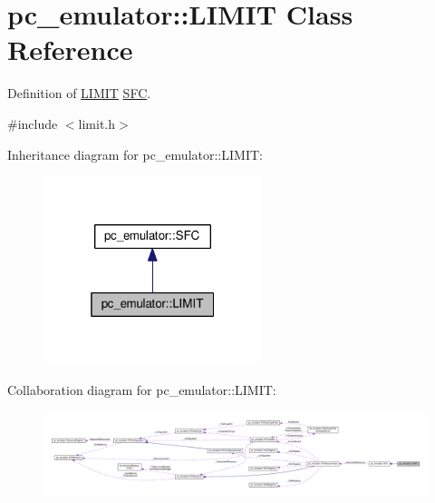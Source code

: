 \hypertarget{classpc__emulator_1_1LIMIT}{}\section{pc\+\_\+emulator\+:\+:L\+I\+M\+IT Class Reference}
\label{classpc__emulator_1_1LIMIT}


Definition of \hyperlink{classpc__emulator_1_1LIMIT}{L\+I\+M\+IT} \hyperlink{classpc__emulator_1_1SFC}{S\+FC}.  




{\ttfamily \#include $<$limit.\+h$>$}



Inheritance diagram for pc\+\_\+emulator\+:\+:L\+I\+M\+IT\+:\nopagebreak
\begin{figure}[H]
\begin{center}
\leavevmode
\includegraphics[width=181pt]{classpc__emulator_1_1LIMIT__inherit__graph}
\end{center}
\end{figure}


Collaboration diagram for pc\+\_\+emulator\+:\+:L\+I\+M\+IT\+:\nopagebreak
\begin{figure}[H]
\begin{center}
\leavevmode
\includegraphics[width=350pt]{classpc__emulator_1_1LIMIT__coll__graph}
\end{center}
\end{figure}

